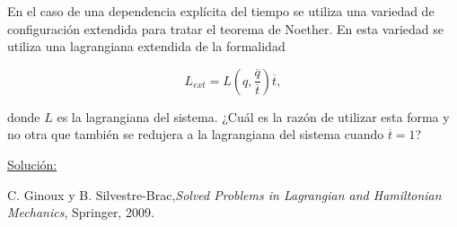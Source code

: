 \documentclass[a4paper,10pt]{article}
\numberwithin{equation}{section}
\begin{document}
En el caso de una dependencia explícita del tiempo se utiliza una variedad de configuración 
extendida para tratar el teorema de Noether. En esta variedad se utiliza una lagrangiana 
extendida de la formalidad

$$
L_{ext} = L(q,\frac{\overline{q}}{\overline{t}})\overline{t},
$$

donde $L$ es la lagrangiana del sistema. ¿Cuál es la razón de utilizar esta forma y no 
otra que también se redujera a la lagrangiana del sistema cuando $\overline{t}=1$?

\vspace{.3cm}

\underline{Solución:} \vspace{.3cm}

\begin{thebibliography}{20}
C. Ginoux y B. Silvestre-Brac,\emph{Solved Problems in Lagrangian and Hamiltonian Mechanics},
Springer, 2009.
\end{thebibliography}
\end{document}

